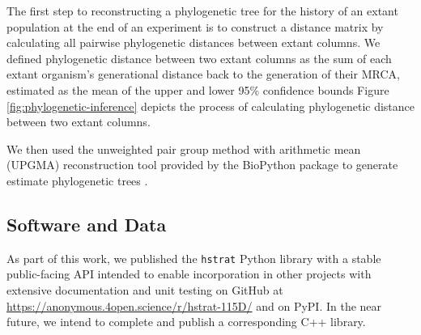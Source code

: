 

The first step to reconstructing a phylogenetic tree for the history of an extant population at the end of an experiment is to construct a distance matrix by calculating all pairwise phylogenetic distances between extant columns.
We defined phylogenetic distance between two extant columns as the sum of each extant organism's generational distance back to the generation of their MRCA, estimated as the mean of the upper and lower 95\% confidence bounds
Figure \ref{fig:phylogenetic-inference} depicts the process of calculating phylogenetic distance between two extant columns.

We then used the unweighted pair group method with arithmetic mean (UPGMA) reconstruction tool provided by the BioPython package to generate estimate phylogenetic trees \citep{cock2009biopython,sokal1958statistical}.

\subsection{Software and Data}


As part of this work, we published the \texttt{hstrat} Python library with a stable public-facing API intended to enable incorporation in other projects with extensive documentation and unit testing on GitHub at \url{https://anonymous.4open.science/r/hstrat-115D/} and on PyPI.%
In the near future, we intend to complete and publish a corresponding C++ library.

